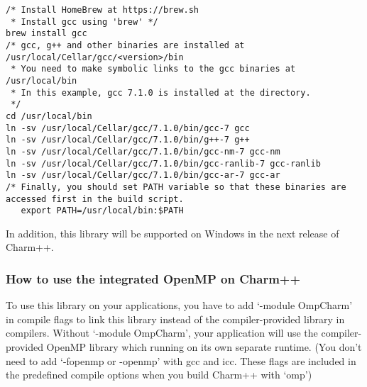 \begin{verbatim}
/* Install HomeBrew at https://brew.sh
 * Install gcc using 'brew' */
brew install gcc
/* gcc, g++ and other binaries are installed at /usr/local/Cellar/gcc/<version>/bin
 * You need to make symbolic links to the gcc binaries at /usr/local/bin
 * In this example, gcc 7.1.0 is installed at the directory.
 */
cd /usr/local/bin
ln -sv /usr/local/Cellar/gcc/7.1.0/bin/gcc-7 gcc
ln -sv /usr/local/Cellar/gcc/7.1.0/bin/g++-7 g++
ln -sv /usr/local/Cellar/gcc/7.1.0/bin/gcc-nm-7 gcc-nm
ln -sv /usr/local/Cellar/gcc/7.1.0/bin/gcc-ranlib-7 gcc-ranlib
ln -sv /usr/local/Cellar/gcc/7.1.0/bin/gcc-ar-7 gcc-ar
/* Finally, you should set PATH variable so that these binaries are accessed first in the build script.
   export PATH=/usr/local/bin:$PATH
\end{verbatim}

In addition, this library will be supported on Windows in the next release of Charm++.

\subsubsection{How to use the integrated OpenMP on Charm++}

To use this library on your applications, you have to add `-module OmpCharm' in compile flags 
to link this library instead of the compiler-provided library in compilers. Without `-module OmpCharm', 
your application will use the compiler-provided OpenMP library which running on its own separate runtime. 
(You don't need to add `-fopenmp or -openmp' with gcc and icc. These flags are included 
in the predefined compile options when you build Charm++ with `omp')

